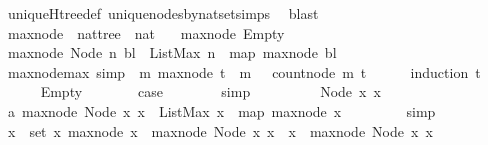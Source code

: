 \begin{isabellebody}
\endisadelimproof
%
\isatagproof
{}\isamarkupfalse%
\ uniqueH{\isacharunderscore}tree{\isacharunderscore}def\ unique{\isacharunderscore}nodes{\isacharunderscore}by{\isacharunderscore}nat{\isacharunderscore}set{\isachardot}simps\ \isamarkupfalse%
\ blast%
\endisatagproof
{\isafoldproof}%
%
\isadelimproof
\isanewline
%
\endisadelimproof
\ \ \ \ \isanewline
{}\isamarkupfalse%
\ max{\isacharunderscore}node\ {\isacharcolon}{\isacharcolon}\ {\isachardoublequoteopen}nattree\ {\isasymRightarrow}\ nat{\isachardoublequoteclose}\ \isanewline
\ \ {\isachardoublequoteopen}max{\isacharunderscore}node\ Empty\ {\isacharequal}\ {}{\isachardoublequoteclose}\isanewline
{\isacharbar}\ {\isachardoublequoteopen}max{\isacharunderscore}node\ {\isacharparenleft}Node\ n\ bl{\isacharparenright}\ {\isacharequal}\ ListMax\ {\isacharparenleft}n\ {\isacharhash}\ {\isacharparenleft}map\ max{\isacharunderscore}node\ bl{\isacharparenright}{\isacharparenright}{\isachardoublequoteclose}\isanewline
\ \ \isanewline
{}\isamarkupfalse%
\ max{\isacharunderscore}node{\isacharunderscore}max\ {\isacharbrackleft}simp{\isacharbrackright}{\isacharcolon}\ {\isachardoublequoteopen}{\isasymforall}\ m{\isachardot}\ max{\isacharunderscore}node\ t\ {\isacharless}\ m\ \ {\isasymlongrightarrow}\ count{\isacharunderscore}node\ m\ t\ {\isacharequal}\ {}{\isachardoublequoteclose}\isanewline
%
\isadelimproof
\ \ %
\endisadelimproof
%
\isatagproof
{}\isamarkupfalse%
\ {\isacharparenleft}induction\ t{\isacharparenright}\isanewline
\ \ \ \ \isamarkupfalse%
\ Empty\isanewline
\ \ \ \ \isamarkupfalse%
\ \isamarkupfalse%
\ {\isacharquery}case\isanewline
\ \ \ \ \ \ \isamarkupfalse%
\ simp\ \isanewline
\ \ \isamarkupfalse%
\isanewline
\ \ \ \ \isamarkupfalse%
\ {\isacharparenleft}Node\ x{}\ x{}{\isacharparenright}\isanewline
\ \ \ \ \isamarkupfalse%
\ a{\isacharcolon}\ {\isachardoublequoteopen}max{\isacharunderscore}node\ {\isacharparenleft}Node\ x{}\ x{}{\isacharparenright}\ {\isacharequal}\ ListMax\ {\isacharparenleft}x{}\ {\isacharhash}\ {\isacharparenleft}map\ max{\isacharunderscore}node\ x{}{\isacharparenright}{\isacharparenright}{\isachardoublequoteclose}\ \isanewline
\ \ \ \ \ \ \isamarkupfalse%
\ simp\isanewline
\ \ \ \ \isamarkupfalse%
\ \isamarkupfalse%
\ {\isachardoublequoteopen}{\isasymforall}x\ {\isasymin}\ set\ x{}{\isachardot}\ max{\isacharunderscore}node\ x\ {\isasymle}\ max{\isacharunderscore}node\ {\isacharparenleft}Node\ x{}\ x{}{\isacharparenright}\ {\isasymand}\ x{}\ {\isasymle}\ max{\isacharunderscore}node\ {\isacharparenleft}Node\ x{}\ x{}{\isacharparenright}{\isachardoublequoteclose}\isanewline

\end{isabellebody}
